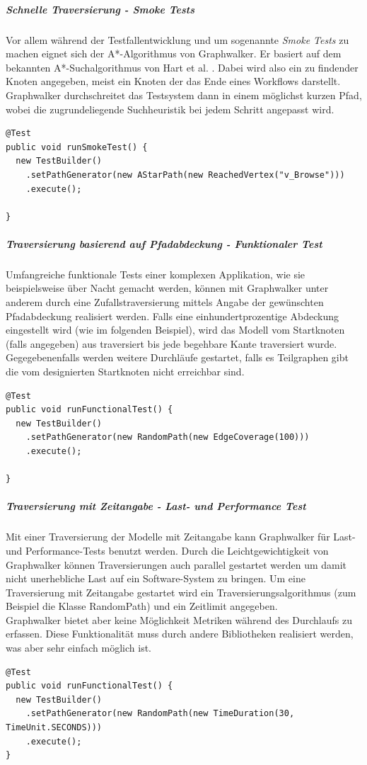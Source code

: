 \subparagraph{Schnelle Traversierung - Smoke Tests}
Vor allem während der Testfallentwicklung und um sogenannte \textit{Smoke Tests} zu machen eignet sich der A*-Algorithmus von Graphwalker. Er basiert auf dem bekannten A*-Suchalgorithmus von Hart et al. \cite{hart_formal_1968}. Dabei wird also ein zu findender Knoten angegeben, meist ein Knoten der das Ende eines Workflows darstellt. Graphwalker durchschreitet das Testsystem dann in einem möglichst kurzen Pfad, wobei die zugrundeliegende Suchheuristik bei jedem Schritt angepasst wird.

\begin{verbatim}
@Test
public void runSmokeTest() {
  new TestBuilder()
    .setPathGenerator(new AStarPath(new ReachedVertex("v_Browse")))
    .execute();
    
}
\end{verbatim}


\subparagraph{Traversierung basierend auf Pfadabdeckung - Funktionaler Test}
Umfangreiche funktionale Tests einer komplexen Applikation, wie sie beispielsweise über Nacht gemacht werden, können mit Graphwalker unter anderem durch eine Zufallstraversierung mittels Angabe der gewünschten Pfadabdeckung realisiert werden. Falls eine einhundertprozentige Abdeckung eingestellt wird (wie im folgenden Beispiel), wird das Modell vom Startknoten (falls angegeben) aus traversiert bis jede begehbare Kante traversiert wurde. Gegegebenenfalls werden weitere Durchläufe gestartet, falls es Teilgraphen gibt die vom designierten Startknoten nicht erreichbar sind. 

\begin{verbatim}
@Test
public void runFunctionalTest() {
  new TestBuilder()
    .setPathGenerator(new RandomPath(new EdgeCoverage(100)))
    .execute();
    
}
\end{verbatim}

\subparagraph{Traversierung mit Zeitangabe - Last- und Performance Test}
Mit einer Traversierung der Modelle mit Zeitangabe kann Graphwalker für Last- und Performance-Tests benutzt werden. Durch die Leichtgewichtigkeit von Graphwalker können Traversierungen auch parallel gestartet werden um damit nicht unerhebliche Last auf ein Software-System zu bringen. Um eine Traversierung mit Zeitangabe gestartet wird ein Traversierungsalgorithmus (zum Beispiel die Klasse RandomPath) und ein Zeitlimit angegeben.\\
Graphwalker bietet aber keine Möglichkeit Metriken während des Durchlaufs zu erfassen. Diese Funktionalität muss durch andere Bibliotheken realisiert werden, was aber sehr einfach möglich ist.
\begin{verbatim}
@Test
public void runFunctionalTest() {  
  new TestBuilder()
    .setPathGenerator(new RandomPath(new TimeDuration(30, TimeUnit.SECONDS)))
    .execute();
}
\end{verbatim}


